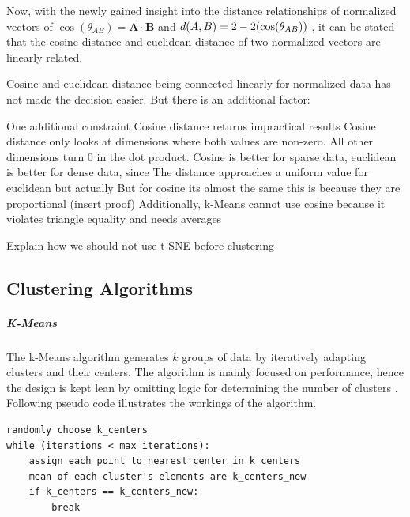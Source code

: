 		Now, with the newly gained insight into the distance relationships of normalized vectors of $\cos(\theta_{AB}) = \mathbf{A} \cdot \mathbf{B}$ and $d(A, B) = 2 - 2(\cos(\theta_{AB})) \\$ , it can be stated that the cosine distance and euclidean distance of two normalized vectors are linearly related.
				
		Cosine and euclidean distance being connected linearly for normalized data has not made the decision easier. But there is an additional factor: 
		
		One additional constraint
		Cosine distance returns impractical results 
		Cosine distance only looks at dimensions where both values are non-zero. All other dimensions turn 0 in the dot product.
		  Cosine is better for sparse data, euclidean is better for dense data, since The distance approaches a uniform value for euclidean 
		but actually
		But for cosine its almost the same
		this is because they are proportional
		(insert proof)
		Additionally, k-Means cannot use cosine
		because it violates triangle equality and needs averages

		Explain how we should not use t-SNE before clustering
\subsection{Clustering Algorithms}
		
		\subparagraph{K-Means}
		The k-Means algorithm generates $k$ groups of data by iteratively adapting clusters and their centers. The algorithm is mainly focused on performance, hence the design is kept lean by omitting logic for determining the number of clusters \cite[c.~6.2]{40algorithms}. Following pseudo code illustrates the workings of the algorithm.
		
		\begin{lstlisting}
randomly choose k_centers
while (iterations < max_iterations):
	assign each point to nearest center in k_centers
	mean of each cluster's elements are k_centers_new
	if k_centers == k_centers_new:
		break
		\end{lstlisting}
	
